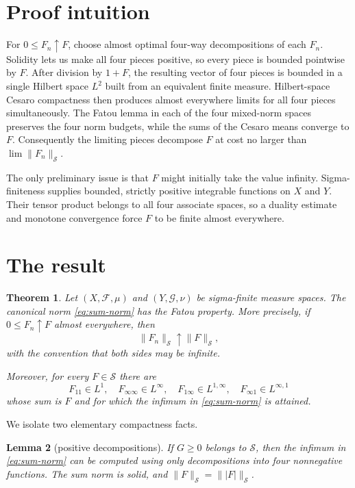 \documentclass[11pt]{article}
\newtheorem{theorem}{Theorem}
\newtheorem{lemma}[theorem]{Lemma}
\newcommand{\Sspace}{\mathcal S}
\begin{document}
\section{Proof intuition}

For $0\leq F_n\uparrow F$, choose almost optimal four-way decompositions of
each $F_n$.  Solidity lets us make all four pieces positive, so every piece is
bounded pointwise by $F$.  After division by $1+F$, the resulting vector of
four pieces is bounded in a single Hilbert space $L^2$ built from an equivalent
finite measure.  Hilbert-space Cesaro compactness then produces almost
everywhere limits for all four pieces simultaneously.  The Fatou lemma in
each of the four mixed-norm spaces preserves the four norm budgets, while the
sums of the Cesaro means converge to $F$.  Consequently the limiting pieces
decompose $F$ at cost no larger than $\lim\|F_n\|_{\Sspace}$.

The only preliminary issue is that $F$ might initially take the value infinity.
Sigma-finiteness supplies bounded, strictly positive integrable functions on
$X$ and $Y$.  Their tensor product belongs to all four associate spaces, so a
duality estimate and monotone convergence force $F$ to be finite almost
everywhere.

\section{The result}

\begin{theorem}\label{thm:main}
Let $(X,\mathcal F,\mu)$ and $(Y,\mathcal G,\nu)$ be sigma-finite measure
spaces.  The canonical norm \eqref{eq:sum-norm} has the Fatou property.  More
precisely, if $0\leq F_n\uparrow F$ almost everywhere, then
\[
 \|F_n\|_{\Sspace}\uparrow\|F\|_{\Sspace},
\]
with the convention that both sides may be infinite.

Moreover, for every $F\in\Sspace$ there are
\[
 F_{11}\in L^1,\quad F_{\infty\infty}\in L^\infty,\quad
 F_{1\infty}\in L^{1,\infty},\quad
 F_{\infty1}\in L^{\infty,1}
\]
whose sum is $F$ and for which the infimum in \eqref{eq:sum-norm} is attained.
\end{theorem}

We isolate two elementary compactness facts.

\begin{lemma}[positive decompositions]\label{lem:positive}
If $G\geq0$ belongs to $\Sspace$, then the infimum in
\eqref{eq:sum-norm} can be computed using only decompositions into four
nonnegative functions.  The sum norm is solid, and
$\|F\|_{\Sspace}=\||F|\|_{\Sspace}$.
\end{lemma}
\end{document}
